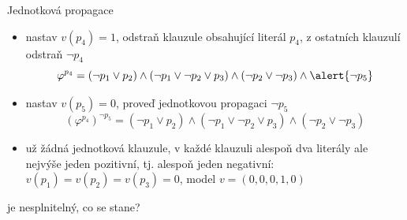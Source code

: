 \documentclass{beamer}
\begin{document}
\begin{frame}{Jednotková propagace}
    

    \pause
    \begin{itemize}[<+->]
        \item nastav $v(p_4)=1$, odstraň klauzule obsahující literál $p_4$, z ostatních klauzulí odstraň $\neg p_4$
        $$
        \varphi^{p_4}=(\neg p_1\lor p_2)\land(\neg p_1\lor\neg p_2\lor p_3)\land (\neg p_2\lor\neg p_3)\land\alert{\neg p_5}
        $$
        \item nastav $v(p_5)=0$, proveď jednotkovou propagaci $\neg p_5$
        $$
        (\varphi^{p_4})^{\neg p_5}=(\neg p_1\lor p_2)\land(\neg p_1\lor\neg p_2\lor p_3)\land(\neg p_2\lor\neg p_3)
        $$
        \item už žádná jednotková klauzule, v každé klauzuli alespoň dva literály ale \alert{nejvýše jeden pozitivní, tj. alespoň jeden negativní}: $v(p_1)=v(p_2)=v(p_3)=0$, model $v=(0,0,0,1,0)$
    \end{itemize}
    \pause
    \pause
    \pause
     je nesplnitelný, co se stane?

\end{frame}
\end{document}
